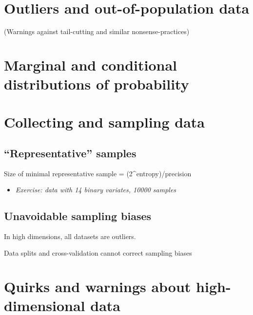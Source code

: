 \documentclass[
  a4paper,
  DIV=11,
  numbers=noendperiod,
  oneside]{scrreprt}
\providecommand{\tightlist}{%
  \setlength{\itemsep}{0pt}\setlength{\parskip}{0pt}}\usepackage{longtable,booktabs,array}
\begin{document}
\hypertarget{outliers-and-out-of-population-data}{%
\section{Outliers and out-of-population
data}\label{outliers-and-out-of-population-data}}

(Warnings against tail-cutting and similar nonsense-practices)

\hypertarget{marginal-and-conditional-distributions-of-probability}{%
\section{Marginal and conditional distributions of
probability}\label{marginal-and-conditional-distributions-of-probability}}

\hypertarget{collecting-and-sampling-data}{%
\section{Collecting and sampling
data}\label{collecting-and-sampling-data}}

\hypertarget{representative-samples}{%
\subsection{``Representative'' samples}\label{representative-samples}}

Size of minimal representative sample = (2\^{}entropy)/precision

\begin{itemize}
\tightlist
\item
  \emph{Exercise: data with 14 binary variates, 10000 samples}
\end{itemize}

\hypertarget{unavoidable-sampling-biases}{%
\subsection{Unavoidable sampling
biases}\label{unavoidable-sampling-biases}}

In high dimensions, all datasets are outliers.

Data splits and cross-validation cannot correct sampling biases

\hypertarget{quirks-and-warnings-about-high-dimensional-data}{%
\section{Quirks and warnings about high-dimensional
data}\label{quirks-and-warnings-about-high-dimensional-data}}
\end{document}
